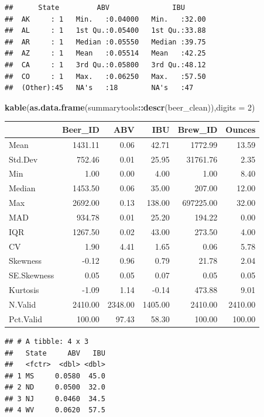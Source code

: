 \documentclass[]{article}
\newenvironment{Shaded}{\begin{snugshade}}{\end{snugshade}}
\newcommand{\KeywordTok}[1]{\textcolor[rgb]{0.13,0.29,0.53}{\textbf{#1}}}
\newcommand{\DataTypeTok}[1]{\textcolor[rgb]{0.13,0.29,0.53}{#1}}
\newcommand{\DecValTok}[1]{\textcolor[rgb]{0.00,0.00,0.81}{#1}}
\newcommand{\StringTok}[1]{\textcolor[rgb]{0.31,0.60,0.02}{#1}}
\newcommand{\OperatorTok}[1]{\textcolor[rgb]{0.81,0.36,0.00}{\textbf{#1}}}
\newcommand{\NormalTok}[1]{#1}
\begin{document}
\begin{verbatim}
##      State         ABV               IBU       
##  AK     : 1   Min.   :0.04000   Min.   :32.00  
##  AL     : 1   1st Qu.:0.05400   1st Qu.:33.88  
##  AR     : 1   Median :0.05550   Median :39.75  
##  AZ     : 1   Mean   :0.05514   Mean   :42.25  
##  CA     : 1   3rd Qu.:0.05800   3rd Qu.:48.12  
##  CO     : 1   Max.   :0.06250   Max.   :57.50  
##  (Other):45   NA's   :18        NA's   :47
\end{verbatim}

\begin{Shaded}
\begin{Highlighting}[]
\KeywordTok{kable}\NormalTok{(}\KeywordTok{as.data.frame}\NormalTok{(summarytools}\OperatorTok{::}\KeywordTok{descr}\NormalTok{(beer_clean)),}\DataTypeTok{digits =} \DecValTok{2}\NormalTok{)}
\end{Highlighting}
\end{Shaded}

\begin{longtable}[]{@{}lrrrrr@{}}
\toprule
& Beer\_ID & ABV & IBU & Brew\_ID & Ounces\tabularnewline
\midrule
\endhead
Mean & 1431.11 & 0.06 & 42.71 & 1772.99 & 13.59\tabularnewline
Std.Dev & 752.46 & 0.01 & 25.95 & 31761.76 & 2.35\tabularnewline
Min & 1.00 & 0.00 & 4.00 & 1.00 & 8.40\tabularnewline
Median & 1453.50 & 0.06 & 35.00 & 207.00 & 12.00\tabularnewline
Max & 2692.00 & 0.13 & 138.00 & 697225.00 & 32.00\tabularnewline
MAD & 934.78 & 0.01 & 25.20 & 194.22 & 0.00\tabularnewline
IQR & 1267.50 & 0.02 & 43.00 & 273.50 & 4.00\tabularnewline
CV & 1.90 & 4.41 & 1.65 & 0.06 & 5.78\tabularnewline
Skewness & -0.12 & 0.96 & 0.79 & 21.78 & 2.04\tabularnewline
SE.Skewness & 0.05 & 0.05 & 0.07 & 0.05 & 0.05\tabularnewline
Kurtosis & -1.09 & 1.14 & -0.14 & 473.88 & 9.01\tabularnewline
N.Valid & 2410.00 & 2348.00 & 1405.00 & 2410.00 & 2410.00\tabularnewline
Pct.Valid & 100.00 & 97.43 & 58.30 & 100.00 & 100.00\tabularnewline
\bottomrule
\end{longtable}

\begin{Shaded}
\end{Shaded}

\begin{verbatim}
## # A tibble: 4 x 3
##   State     ABV   IBU
##   <fctr>  <dbl> <dbl>
## 1 MS     0.0580  45.0
## 2 ND     0.0500  32.0
## 3 NJ     0.0460  34.5
## 4 WV     0.0620  57.5
\end{verbatim}
\end{document}
